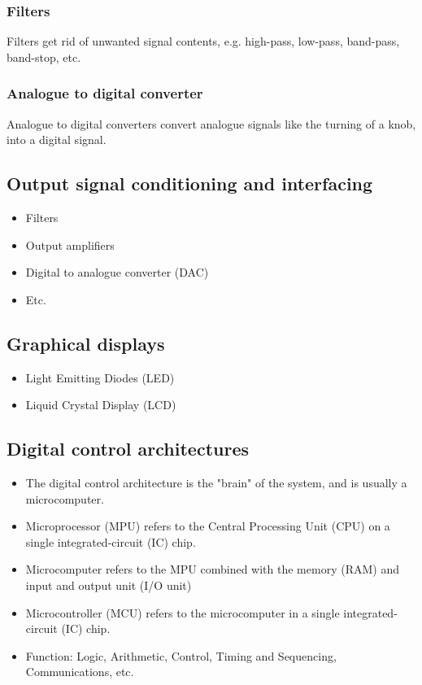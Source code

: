 \documentclass[11pt]{article}
\begin{document}
\subsubsection{Filters}
\label{sec:org830862b}
Filters get rid of unwanted signal contents, e.g. high-pass, low-pass, band-pass, band-stop, etc.

\subsubsection{Analogue to digital converter}
\label{sec:org5ac688c}
Analogue to digital converters convert analogue signals like the turning of a knob, into a digital signal.

\subsection{Output signal conditioning and interfacing}
\label{sec:org7c45235}
\begin{itemize}
\item Filters
\item Output amplifiers
\item Digital to analogue converter (DAC)
\item Etc.
\end{itemize}

\subsection{Graphical displays}
\label{sec:org4efbbb0}
\begin{itemize}
\item Light Emitting Diodes (LED)
\item Liquid Crystal Display (LCD)
\end{itemize}

 \newpage

\subsection{Digital control architectures}
\label{sec:org8831130}
\begin{itemize}
\item The digital control architecture is the "brain" of the system, and is usually a microcomputer.
\item Microprocessor (MPU) refers to the Central Processing Unit (CPU) on a single integrated-circuit (IC) chip.
\item Microcomputer refers to the MPU combined with the memory (RAM) and input and output unit (I/O unit)
\item Microcontroller (MCU) refers to the microcomputer in a single integrated-circuit (IC) chip.
\item Function: Logic, Arithmetic, Control, Timing and Sequencing, Communications, etc.
\end{itemize}
\end{document}
